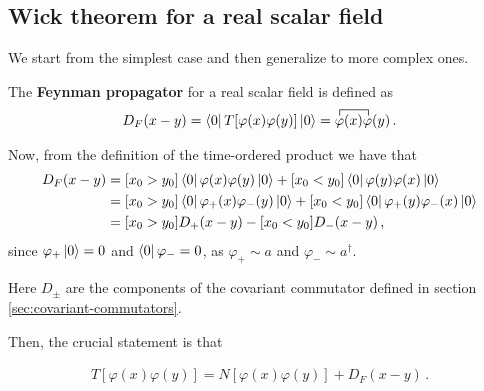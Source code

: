 \documentclass[main.tex]{subfiles}
\begin{document}
\subsection{Wick theorem for a real scalar field}

We start from the simplest case and then generalize to more complex ones. 

\begin{definition}
The \textbf{Feynman propagator} for a real scalar field is defined as 
%
\begin{align}
D_F (x-y) = \bra{0} T[\varphi (x) \varphi (y)] \ket{0} 
= \contraction{}{\varphi}{(x)}{\varphi }
\varphi (x) \varphi (y)
\,.
\end{align}
\end{definition}

Now, from the definition of the time-ordered product we have that 
%
\begin{subequations}
\begin{align}
D_F (x-y) &= 
[x_0 > y_0 ]
\bra{0} \varphi (x) \varphi (y) \ket{0}
+
[x_0 < y_0 ]
\bra{0} \varphi (y) \varphi (x) \ket{0}  \\
&= 
[x_0 > y_0 ]
\bra{0} \varphi_{+} (x) \varphi_{-} (y) \ket{0}
+
[x_0 < y_0 ]
\bra{0} \varphi_{+} (y) \varphi_{-} (x) \ket{0}  \\
&= 
[x_0 > y_0 ]
D_+ (x-y)
-
[x_0 < y_0 ]
D_- (x-y) 
\,,
\end{align}
\end{subequations}
%
since \(\varphi_{+} \ket{0} = 0\) and \(\bra{0} \varphi_{-} = 0 \), as \(\varphi_{+} \sim a\) and \(\varphi_{-} \sim a ^\dag\).

Here \(D_{\pm}\) are the components of the covariant commutator defined in section \ref{sec:covariant-commutators}. 

Then, the crucial statement is that
\begin{claim}
\begin{align}
T [\varphi (x) \varphi (y)] = N[\varphi (x) \varphi (y)] + D_F (x-y)
\,.
\end{align}
\end{claim}
\end{document}

